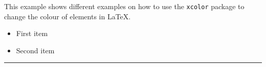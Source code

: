 \documentclass{article}
\begin{document}
This example shows different examples on how to use the \texttt{xcolor} package 
to change the colour of elements in \LaTeX.

\begin{itemize}
\color{blue}
\item First item
\item Second item
\end{itemize}

\noindent
{\color{red} \rule{\linewidth}{0.5mm} }
\end{document}
